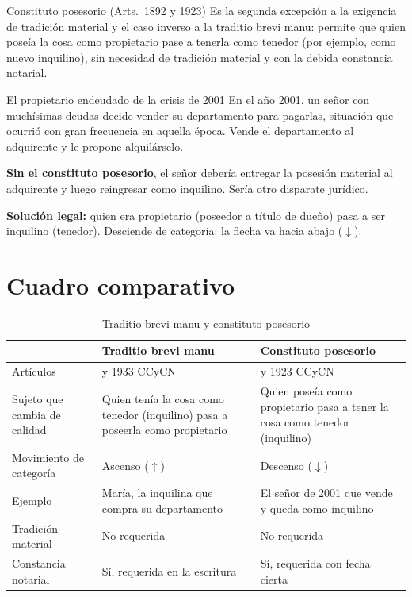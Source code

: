 \documentclass[12pt,oneside]{book}
\begin{document}
\begin{definition}{Constituto posesorio (Arts.~1892 y 1923)}
Es la segunda excepción a la exigencia de tradición material y el caso inverso a la traditio brevi manu: permite que quien poseía la cosa como propietario pase a tenerla como tenedor (por ejemplo, como nuevo inquilino), sin necesidad de tradición material y con la debida constancia notarial.
\end{definition}

\begin{example}{El propietario endeudado de la crisis de 2001}
En el año 2001, un señor con muchísimas deudas decide vender su departamento para pagarlas, situación que ocurrió con gran frecuencia en aquella época. Vende el departamento al adquirente y le propone alquilárselo.

\textbf{Sin el constituto posesorio}, el señor debería entregar la posesión material al adquirente y luego reingresar como inquilino. Sería otro disparate jurídico.

\textbf{Solución legal:} quien era propietario (poseedor a título de dueño) pasa a ser inquilino (tenedor). Desciende de categoría: la flecha va hacia abajo ($\downarrow$).
\end{example}

\section{Cuadro comparativo}

\begin{table}[H]
\centering
\small
\begin{tabularx}{\textwidth}{>{\raggedright\arraybackslash}p{}>{\raggedright\arraybackslash}X>{\raggedright\arraybackslash}X}
\toprule
 & \textbf{Traditio brevi manu} & \textbf{Constituto posesorio} \\
\midrule
Artículos & 1892 y 1933 CCyCN & 1892 y 1923 CCyCN \\[0.4em]
Sujeto que cambia de calidad & Quien tenía la cosa como tenedor (inquilino) pasa a poseerla como propietario & Quien poseía como propietario pasa a tener la cosa como tenedor (inquilino) \\[0.4em]
Movimiento de categoría & Ascenso ($\uparrow$) & Descenso ($\downarrow$) \\[0.4em]
Ejemplo & María, la inquilina que compra su departamento & El señor de 2001 que vende y queda como inquilino \\[0.4em]
Tradición material & No requerida & No requerida \\[0.4em]
Constancia notarial & Sí, requerida en la escritura & Sí, requerida con fecha cierta \\
\bottomrule
\end{tabularx}
\caption{Traditio brevi manu y constituto posesorio}
\end{table}
\end{document}
